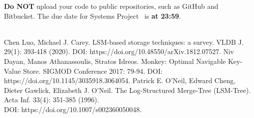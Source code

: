 \documentclass[12pt,a4paper,twoside]{article}
\newcommand{\assignmenttype}{Systems Project}       %
\newcommand{\assignmentnumber}{\hspace{-0.2em}}           %
\begin{document}
\noindent \textbf{Do NOT} upload your code to public repositories, such as GitHub and Bitbucket. 
The due date for \assignmenttype{}\ \assignmentnumber{} is \textbf{ at 23:59}. \\\\



\begin{thebibliography}{9}
Chen Luo, Michael J. Carey. LSM-based storage techniques: a survey. VLDB J. 29(1): 393-418 (2020). DOI: https://doi.org/10.48550/arXiv.1812.07527.
Niv Dayan, Manos Athanassoulis, Stratos Idreos. Monkey: Optimal Navigable Key-Value Store. SIGMOD Conference 2017: 79-94. DOI: https://doi.org/10.1145/3035918.3064054.
Patrick E. O'Neil, Edward Cheng, Dieter Gawlick, Elizabeth J. O'Neil. The Log-Structured Merge-Tree (LSM-Tree). Acta Inf. 33(4): 351-385 (1996). \\DOI: https://doi.org/10.1007/s002360050048.
\end{thebibliography}
\end{document}
